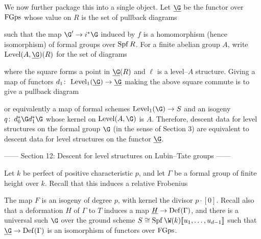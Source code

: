 \begin{example}
We now further package this into a single object.  Let $\underline{\G}$ be the functor over $\mathrm{FGps}$ whose value on $R$ is the set of pullback diagrams
\begin{center}
\end{center}
such that the map $\G' \to i^* \G$ induced by $f$ is a homomorphism (hence isomorphism) of formal groups over $\operatorname{Spf} R$.  For a finite abelian group $A$, write $\Level(A, \underline{\G})(R)$ for the set of diagrams
\begin{center}
\end{center}
where the square forms a point in $\underline{\G}(R)$ and $\ell$ is a level--$A$ structure.  Giving a map of functors $d_1\co \Level_1(\underline{\G}) \to \underline{\G}$ making the above square commute is to give a pullback diagram
\begin{center}
\end{center}
or equivalently a map of formal schemes $\Level_1(\G) \to S$ and an isogeny $q\co d_0^* \G d_1^* \G$ whose kernel on $\Level(A, \G)$ is $A$.  Therefore, descent data for level structures on the formal group $\G$ (in the sense of Section 3) are equivalent to descent data for level structures on the functor $\underline{\G}$.
\end{example}

------ Section 12: Descent for level structures on Lubin--Tate groups ------

Let $k$ be perfect of positive characteristic $p$, and let $\Gamma$ be a formal group of finite height over $k$.  Recall that this induces a relative Frobenius
\begin{center}
\end{center}
The map $F$ is an isogeny of degree $p$, with kernel the divisor $p \cdot [0]$.  Recall also that a deformation $H$ of $\Gamma$ to $T$ induces a map $\underline{H} \to \operatorname{Def}(\Gamma)$, and there is a universal such $\G$ over the ground scheme $S \cong \Spf \W(k)\ps{u_1, \ldots, u_{d-1}}$ such that $\underline{\G} \to \Def(\Gamma)$ is an isomorphism of functors over $\mathrm{FGps}$.

